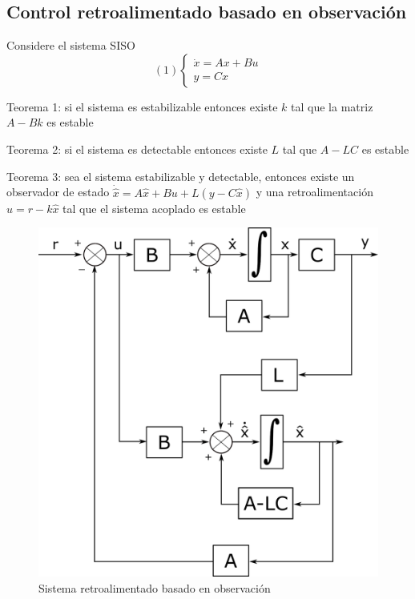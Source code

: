 \subsection{Control retroalimentado basado en observación}

Considere el sistema SISO
\[(1)
    \left\{
        \begin{array}{lll}
            \dot{x} = Ax + Bu \\
            y = Cx
        \end{array}
    \right.
\]

Teorema 1: si el sistema es estabilizable entonces existe \( k \) tal que la matriz \( A-Bk \) es estable

Teorema 2: si el sistema es detectable entonces existe \( L \) tal que \( A-LC \) es estable

Teorema 3: sea el sistema estabilizable y detectable, entonces existe un observador de estado \( \dot{\hat{x}} = A\hat{x} + Bu + L(y-C\hat{x}) \) y una retroalimentación \( u=r-k\hat{x} \) tal que el sistema acoplado es estable
\begin{figure}[ht]
    \centering
        \includegraphics[scale=0.19]{Control de Sistemas Mecatronicos Figuras/11 Sistema con Observador Retroalimentado.png}
        \caption{Sistema retroalimentado basado en observación}
\end{figure}

